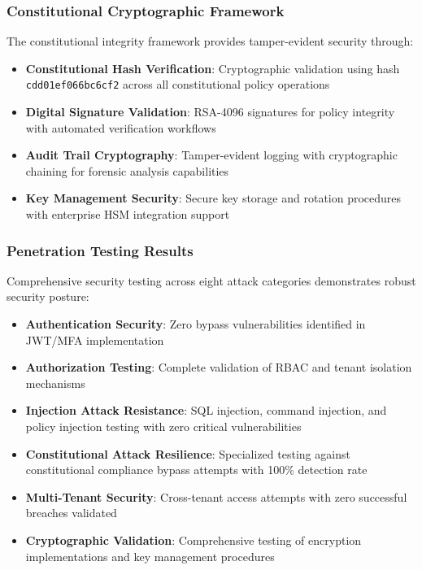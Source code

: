 \subsubsection{Constitutional Cryptographic Framework}
The constitutional integrity framework provides tamper-evident security through:
\begin{itemize}[leftmargin=*,itemsep=1pt,parsep=1pt]
    \item \textbf{Constitutional Hash Verification}: Cryptographic validation using hash \texttt{cdd01ef066bc6cf2} across all constitutional policy operations
    \item \textbf{Digital Signature Validation}: RSA-4096 signatures for policy integrity with automated verification workflows
    \item \textbf{Audit Trail Cryptography}: Tamper-evident logging with cryptographic chaining for forensic analysis capabilities
    \item \textbf{Key Management Security}: Secure key storage and rotation procedures with enterprise HSM integration support
\end{itemize}

\subsubsection{Penetration Testing Results}
Comprehensive security testing across eight attack categories demonstrates robust security posture:
\begin{itemize}[leftmargin=*,itemsep=1pt,parsep=1pt]
    \item \textbf{Authentication Security}: Zero bypass vulnerabilities identified in JWT/MFA implementation
    \item \textbf{Authorization Testing}: Complete validation of RBAC and tenant isolation mechanisms
    \item \textbf{Injection Attack Resistance}: SQL injection, command injection, and policy injection testing with zero critical vulnerabilities
    \item \textbf{Constitutional Attack Resilience}: Specialized testing against constitutional compliance bypass attempts with 100\% detection rate
    \item \textbf{Multi-Tenant Security}: Cross-tenant access attempts with zero successful breaches validated
    \item \textbf{Cryptographic Validation}: Comprehensive testing of encryption implementations and key management procedures
\end{itemize}

